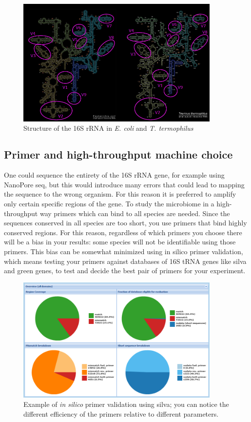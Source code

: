    \begin{figure}[H]
      \centering
      \includegraphics[width=0.9\textwidth]{16S_rRNA.png}
      \caption{\label{fig:16S_rRNA}Structure of the 16S rRNA in \textit{E. coli} and \textit{T. termophilus}}
    \end{figure}

  \subsection{Primer and high-throughput machine choice}
    One could sequence the entirety of the 16S rRNA gene, for example using NanoPore seq, but this would introduce many errors that could lead to mapping the sequence to the wrong organism.
    For this reason it is preferred to amplify only certain specific regions of the gene.
    To study the microbiome in a high-throughput way primers which can bind to all species are needed.
    Since the sequences conserved in all species are too short, you use primers that bind highly conserved regions.
    For this reason, regardless of which primers you choose there will be a bias in your results: some species will not be identifiable using those primers.
    This bias can be somewhat minimized using in silico primer validation, which means testing your primers against databases of 16S tRNA genes like silva and green genes, to test and decide the best pair of primers for your experiment.

    \begin{figure}[!h]
      \centering
      \includegraphics[width=0.9\textwidth]{silva_analysis.png}
      \caption{\label{fig:silva_analysis}Example of \textit{in silico} primer validation using silva; you can notice the different efficiency of the primers relative to different parameters.}
    \end{figure}

